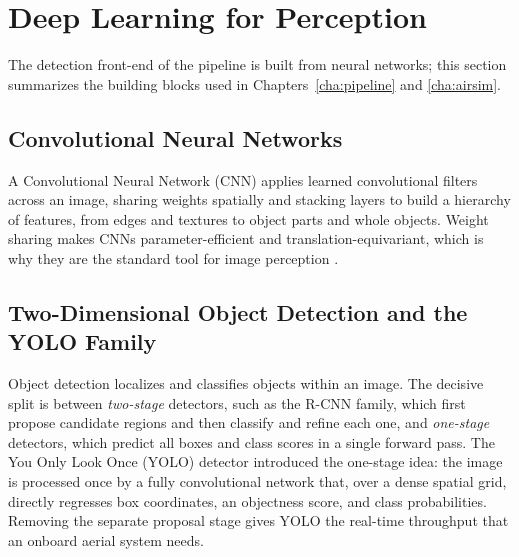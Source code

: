 \section{Deep Learning for Perception}

The detection front-end of the pipeline is built from neural networks; this
section summarizes the building blocks used in Chapters~\ref{cha:pipeline} and
\ref{cha:airsim}.

\subsection{Convolutional Neural Networks}

A Convolutional Neural Network (CNN) applies learned convolutional filters across
an image, sharing weights spatially and stacking layers to build a hierarchy of
features, from edges and textures to object parts and whole objects. Weight
sharing makes CNNs parameter-efficient and translation-equivariant, which is why
they are the standard tool for image perception \cite{lecun2015deeplearning}.

\subsection{Two-Dimensional Object Detection and the YOLO Family}

Object detection localizes and classifies objects within an image. The decisive
split is between \emph{two-stage} detectors, such as the R-CNN family, which first
propose candidate regions and then classify and refine each one, and
\emph{one-stage} detectors, which predict all boxes and class scores in a single
forward pass. The You Only Look Once (YOLO) detector \cite{redmon2016yolo}
introduced the one-stage idea: the image is processed once by a fully
convolutional network that, over a dense spatial grid, directly regresses box
coordinates, an objectness score, and class probabilities. Removing the separate
proposal stage gives YOLO the real-time throughput that an onboard aerial system
needs.

